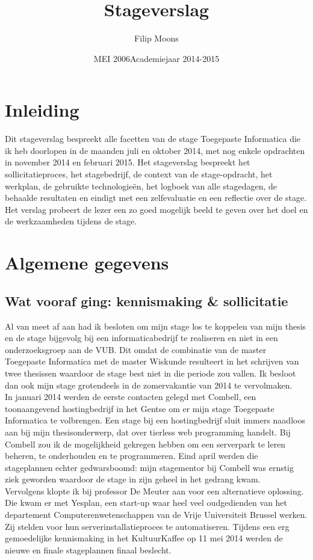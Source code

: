 \documentclass[a4paper,11pt]{article}
\author{Filip Moons}
\title{Stageverslag}
\date{MEI 2006}
\date{Academiejaar 2014-2015}
\theoremstyle{definition}
\begin{document}
\maketitlepage


\tableofcontents
\newpage
\section{Inleiding}
Dit stageverslag bespreekt alle facetten van de stage Toegepaste Informatica die 
ik heb doorlopen in de maanden juli en oktober 2014, met nog enkele opdrachten in 
november 2014 en februari 2015. Het stageverslag bespreekt het sollicitatieproces, 
het stagebedrijf, de context van de stage-opdracht, het werkplan, de gebruikte 
technologieën, het logboek van alle stagedagen, de behaalde resultaten en 
eindigt met een zelfevaluatie en een reflectie over de stage. Het verslag 
probeert de lezer een zo goed mogelijk beeld te geven over het doel en de 
werkzaamheden tijdens de stage.
\newpage
\section{Algemene gegevens}
\subsection{Wat vooraf ging: kennismaking \& sollicitatie}
Al van meet af aan had ik besloten om mijn stage los te koppelen van mijn thesis en de stage
bijgevolg bij een informaticabedrijf te realiseren en niet in een onderzoeksgroep aan de VUB. Dit omdat de combinatie van de master Toegepaste Informatica
met de master Wiskunde resulteert in het schrijven van twee thesissen waardoor de stage best niet in die periode zou vallen. Ik besloot dan ook mijn stage grotendeels in de zomervakantie van 2014 te vervolmaken.\\


\noindent In januari 2014 werden de eerste contacten gelegd met Combell, een toonaangevend
hostingbedrijf in het Gentse om er mijn stage Toegepaste Informatica te volbrengen. 
Een stage bij een hostingbedrijf sluit immers naadloos aan bij mijn 
thesisonderwerp, dat over tierless web programming handelt. Bij Combell zou ik 
de mogelijkheid gekregen hebben om een serverpark te leren beheren, te 
onderhouden en te programmeren. Eind april werden die stageplannen echter 
gedwarsboomd: mijn stagementor bij Combell was ernstig ziek geworden waardoor 
de stage in zijn geheel in het gedrang kwam. \\

\noindent Vervolgens klopte ik bij professor 
De Meuter aan voor een alternatieve oplossing. Die kwam er met Yesplan, een 
start-up waar heel veel oudgedienden van het departement Computerenwetenschappen van de Vrije Universiteit Brussel werken. Zij stelden voor hun 
serverinstallatieproces te automatiseren. Tijdens een erg gemoedelijke 
kennismaking in het KultuurKaffee op 11 mei 2014 werden de nieuwe en finale 
stageplannen finaal beslecht.
\end{document}
